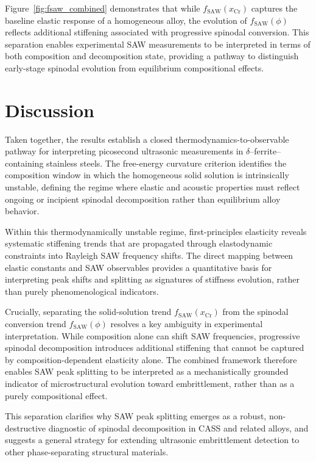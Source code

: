 \documentclass[final,3p,times]{elsarticle}
\begin{document}
Figure~\ref{fig:fsaw_combined} demonstrates that while $f_{\mathrm{SAW}}(x_{\mathrm{Cr}})$ captures the baseline elastic response of a homogeneous alloy, the evolution of $f_{\mathrm{SAW}}(\phi)$ reflects additional stiffening associated with progressive spinodal conversion. This separation enables experimental SAW measurements to be interpreted in terms of both composition and decomposition state, providing a pathway to distinguish early-stage spinodal evolution from equilibrium compositional effects.


\section{Discussion}

Taken together, the results establish a closed thermodynamics-to-observable pathway for interpreting picosecond ultrasonic measurements in $\delta$--ferrite–containing stainless steels. The free-energy curvature criterion identifies the composition window in which the homogeneous solid solution is intrinsically unstable, defining the regime where elastic and acoustic properties must reflect ongoing or incipient spinodal decomposition rather than equilibrium alloy behavior.

Within this thermodynamically unstable regime, first-principles elasticity reveals systematic stiffening trends that are propagated through elastodynamic constraints into Rayleigh SAW frequency shifts. The direct mapping between elastic constants and SAW observables provides a quantitative basis for interpreting peak shifts and splitting as signatures of stiffness evolution, rather than purely phenomenological indicators.

Crucially, separating the solid-solution trend $f_{\mathrm{SAW}}(x_{\mathrm{Cr}})$ from the spinodal conversion trend $f_{\mathrm{SAW}}(\phi)$ resolves a key ambiguity in experimental interpretation. While composition alone can shift SAW frequencies, progressive spinodal decomposition introduces additional stiffening that cannot be captured by composition-dependent elasticity alone. The combined framework therefore enables SAW peak splitting to be interpreted as a mechanistically grounded indicator of microstructural evolution toward embrittlement, rather than as a purely compositional effect.

This separation clarifies why SAW peak splitting emerges as a robust, non-destructive diagnostic of spinodal decomposition in CASS and related alloys, and suggests a general strategy for extending ultrasonic embrittlement detection to other phase-separating structural materials.
\end{document}
